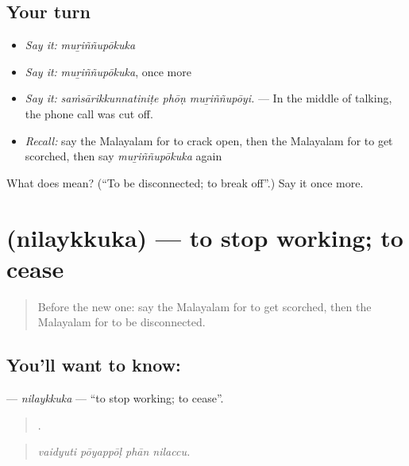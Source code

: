 \subsection*{Your turn}
\begin{itemize}
\raggedright
  \item \emph{Say it:} \emph{muṟiññupōkuka}
  \item \emph{Say it:} \emph{muṟiññupōkuka}, once more
  \item \emph{Say it:} \emph{saṁsārikkunnatiniṭe phōṇ muṟiññupōyi.} — In the middle of talking, the phone call was cut off.
  \item \emph{Recall:} say the Malayalam for to crack open, then the Malayalam for to get scorched, then say \emph{muṟiññupōkuka} again
\end{itemize}

\begin{tcolorbox}[breakable,colback=teal!4,colframe=teal!35!black,title={Before you move on}]
What does  mean? (\textquotedblleft{}To be disconnected; to break off\textquotedblright{}.) Say it once more.
\end{tcolorbox}
\section[\texorpdfstring{\ml{നിലയ്ക്കുക} (nilaykkuka)}{നിലയ്ക്കുക (nilaykkuka)}]{ (nilaykkuka) — to stop working; to cease}

\label{lesson:ML-C514-nilaykkuka}



\begin{quote}
Before the new one: say the Malayalam for to get scorched, then the Malayalam for to be disconnected.
\end{quote}

\subsection*{You'll want to know: }
\textbf{} — \emph{nilaykkuka} — \textquotedblleft{}to stop working; to cease\textquotedblright{}.

\begin{quote}
   .
\end{quote}

\begin{quote}
\emph{vaidyuti pōyappōḷ phān nilaccu.}
\end{quote}

